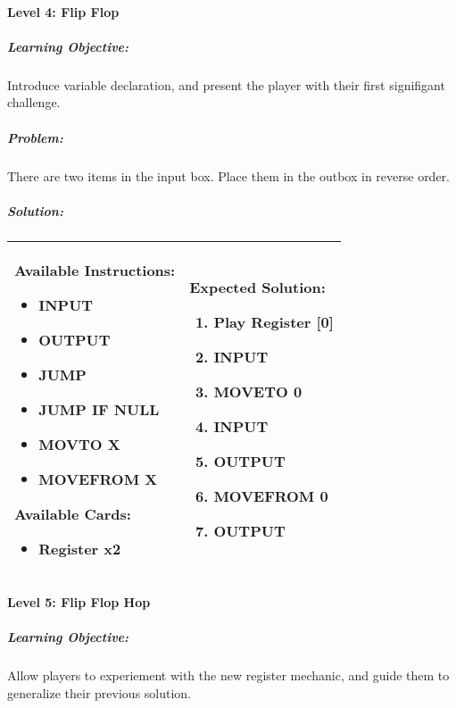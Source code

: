 \paragraph{Level 4: Flip Flop}
\subparagraph{Learning Objective:} Introduce variable declaration, and present the player with their first signifigant challenge.

\subparagraph{Problem:} There are two items in the input box. Place them in the outbox in reverse order.

\subparagraph{Solution:} 
\begin{center}
    \begin{tabular}{ | m{5cm} | m{9cm} | } 
        \hline
            \textbf{Available Instructions:} 
            \begin{itemize}
                \item INPUT
                \item OUTPUT
                \item JUMP
                \item JUMP IF NULL
                \item MOVTO X
                \item MOVEFROM X
            \end{itemize}
            \textbf{Available Cards:} 
            \begin{itemize}
                \item Register x2
            \end{itemize}& 
            \textbf{Expected Solution:} 
            \begin{enumerate}
                \item Play Register [0]
                \item INPUT
                \item MOVETO 0
                \item INPUT
                \item OUTPUT
                \item MOVEFROM 0 
                \item OUTPUT
            \end{enumerate}
            \\
        \hline
    \end{tabular}
\end{center}

\paragraph{Level 5: Flip Flop Hop}
\subparagraph{Learning Objective:} Allow players to experiement with the new register mechanic, and guide them to generalize their previous solution.

